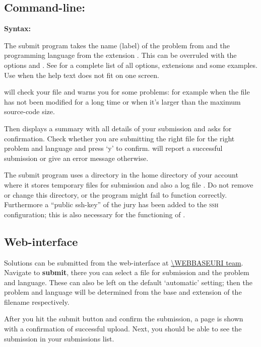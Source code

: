 \subsection{Command-line: }

\textbf{Syntax:} 

The submit program takes the name (label) of the problem from
 and the programming language from the extension
. This can be overruled with the options
 and .
See  for a complete list of all options,
extensions and some examples.  Use 
when the help text does not fit on one screen.

 will check your file and warns you for some problems:
for example when the file has not been modified for a long time or
when it's larger than the maximum source-code size.

Then  displays a summary with all details of your
submission and asks for confirmation. Check whether you are submitting
the right file for the right problem and language and press `y' to
confirm.  will report a successful submission or give
an error message otherwise.

The submit program uses a directory \cmd{\USERSUBMITDIR} in the
home directory of your account where it stores temporary files for
submission and also a log file . Do not remove or
change this directory, or the  program might fail to
function correctly. Furthermore a ``public ssh-key'' of the jury has
been added to the \textsc{ssh} configuration; this is also necessary
for the functioning of .

\subsection{Web-interface}

Solutions can be submitted from the web-interface at \url{\WEBBASEURI team}.
Navigate to \textbf{submit}, there you can select a file for
submission and the problem and language. These can also be left on the
default `automatic' setting; then the problem and language will be
determined from the base and extension of the filename respectively.

After you hit the submit button and confirm the submission, a page is
shown with a confirmation of successful upload. Next, you should be
able to see the submission in your submissions list.

